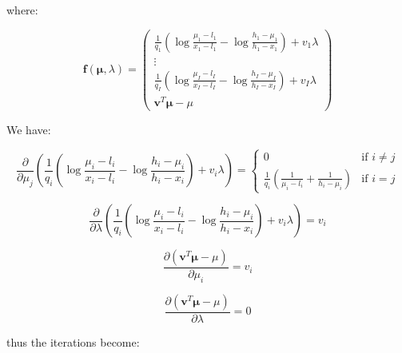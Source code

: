 \documentclass{tex/note}
\begin{document}
where:

\begin{equation*}
\bm{f} \left( \bm{\mu} , \lambda \right) = \begin{pmatrix} \frac{1}{q_1} \left( \log \frac{\mu_1 - l_1}{x_1 - l_1} - \log \frac{h_1 - \mu_1}{h_1 - x_1} \right) + v_1 \lambda \\ \vdots \\ \frac{1}{q_I} \left( \log \frac{\mu_I - l_I}{x_I - l_I} - \log \frac{h_I - \mu_I}{h_I - x_I} \right) + v_I \lambda \\ \bm{v}^T \bm{\mu} - \mu\end{pmatrix}
\end{equation*}

We have:

\begin{equation*}
\frac{\partial}{\partial \mu_j} \left( \frac{1}{q_i} \left( \log \frac{\mu_i - l_i}{x_i - l_i} - \log \frac{h_i - \mu_i}{h_i - x_i} \right) + v_i \lambda \right) =
\begin{cases}
0 & \text{if } i \neq j \\
\frac{1}{q_i} \left( \frac{1}{\mu_i - l_i} + \frac{1}{h_i - \mu_i} \right) & \text{if } i = j
\end{cases}
\end{equation*}

\begin{equation*}
\frac{\partial}{\partial \lambda} \left( \frac{1}{q_i} \left( \log \frac{\mu_i - l_i}{x_i - l_i} - \log \frac{h_i - \mu_i}{h_i - x_i} \right) + v_i \lambda \right) = v_i
\end{equation*}

\begin{equation*}
\frac{\partial \left( \bm{v}^T \bm{\mu} - \mu \right)}{\partial \mu_i} = v_i
\end{equation*}

\begin{equation*}
\frac{\partial \left( \bm{v}^T \bm{\mu} - \mu \right)}{\partial \lambda} = 0
\end{equation*}

thus the iterations become:
\end{document}
